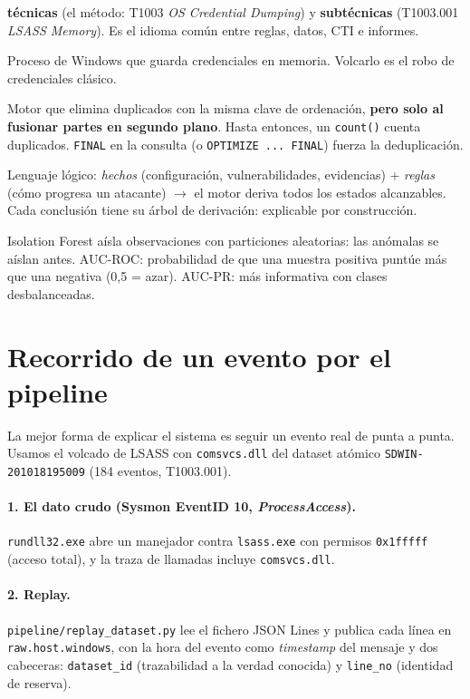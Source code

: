 \documentclass[11pt,a4paper]{article}
\newcommand{\cod}[1]{\texttt{#1}}
\newcommand{\flecha}{$\rightarrow$}
\begin{document}
\begin{description}[style=nextline,leftmargin=0.6cm,font=\bfseries\color{azul}]
  \textbf{técnicas} (el método: T1003 \textit{OS Credential Dumping}) y \textbf{subtécnicas}
  (T1003.001 \textit{LSASS Memory}). Es el idioma común entre reglas, datos, CTI e informes.
\item[LSASS]
  Proceso de Windows que guarda credenciales en memoria. Volcarlo es el robo de credenciales clásico.
\item[ClickHouse \cod{ReplacingMergeTree} y \cod{FINAL}]
  Motor que elimina duplicados con la misma clave de ordenación, \textbf{pero solo al fusionar partes en
  segundo plano}. Hasta entonces, un \cod{count()} cuenta duplicados. \cod{FINAL} en la consulta (o
  \cod{OPTIMIZE ... FINAL}) fuerza la deduplicación.
\item[Datalog / MulVAL]
  Lenguaje lógico: \textit{hechos} (configuración, vulnerabilidades, evidencias) + \textit{reglas}
  (cómo progresa un atacante) \flecha{} el motor deriva todos los estados alcanzables. Cada conclusión
  tiene su árbol de derivación: explicable por construcción.
\item[Isolation Forest, AUC-ROC, AUC-PR]
  Isolation Forest aísla observaciones con particiones aleatorias: las anómalas se aíslan antes.
  AUC-ROC: probabilidad de que una muestra positiva puntúe más que una negativa (0,5 = azar).
  AUC-PR: más informativa con clases desbalanceadas.
\end{description}

\newpage
\section{Recorrido de un evento por el pipeline}\label{sec:recorrido}

La mejor forma de explicar el sistema es seguir un evento real de punta a punta. Usamos el volcado de
LSASS con \cod{comsvcs.dll} del dataset atómico \cod{SDWIN-201018195009} (184 eventos, T1003.001).

\paragraph{1. El dato crudo (Sysmon EventID 10, \textit{ProcessAccess}).}
\cod{rundll32.exe} abre un manejador contra \cod{lsass.exe} con permisos \cod{0x1fffff} (acceso total), y la
traza de llamadas incluye \cod{comsvcs.dll}.

\paragraph{2. Replay.} \cod{pipeline/replay\_dataset.py} lee el fichero JSON Lines y publica cada línea en
\cod{raw.host.windows}, con la hora del evento como \textit{timestamp} del mensaje y dos cabeceras:
\cod{dataset\_id} (trazabilidad a la verdad conocida) y \cod{line\_no} (identidad de reserva).
\end{document}
